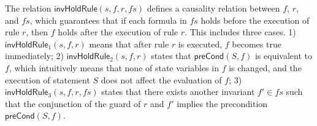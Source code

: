 \documentclass{llncs}
\newlength{\fminilength}
\newenvironment{fmini}[1][\linewidth]
  {\setlength{\fminilength}{#1\fboxsep-2\fboxrule}%
   \vspace{2ex}\noindent\begin{lrbox}{\fminibox}\begin{minipage}{\fminilength}%
   \mbox{ }\hfill\vspace{-2.5ex}}%
  {\end{minipage}\end{lrbox}\vspace{1ex}\hspace{0ex}%
   \framebox{\usebox{\fminibox}}}
\newenvironment{specification}
{\noindent\scriptsize
\tt\begin{fmini}\begin{tabbing}X\=X12345\=XXXX\=XXXX\=XXXX\=XXXX\=XXXX
\=\+\kill} {\end{tabbing}\normalfont\end{fmini}}
\begin{document}









The relation $\mathsf{invHoldRule}(s, f,r,fs)$ defines a causality relation
between $f$, $r$, and $fs$, which guarantees that if each formula in $fs$ holds
before the execution of rule $r$, then $f$ holds after the execution of rule $r$. This includes three cases. 1) $\mathsf{invHoldRule}_1(s,f, r)$ means that after rule $r$ is executed, $f$ becomes true immediately;   2) $\mathsf{invHoldRule}_2(s,f, r)$ states that $\mathsf{preCond}(S,f)$ is equivalent to $f$, which intuitively means that none of state variables in $f$ is changed, and the execution of statement $S$ does not affect the evaluation of $f$;
 3) $\mathsf{invHoldRule}_3(s,f, r,fs)$ states that there exists another invariant $f' \in fs$ such that
  the conjunction of the guard of $r$ and $f'$ implies the precondition  $\mathsf{preCond}(S,f)$.
\end{document}
